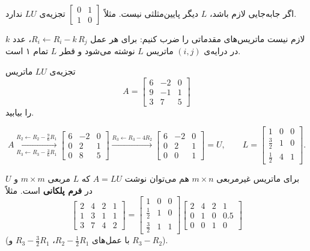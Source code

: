 \begin{warning}
اگر جابه‌جایی لازم باشد، $L$ دیگر پایین‌مثلثی نیست. مثلاً $\begin{bmatrix}0&1\\1&0\end{bmatrix}$ تجزیه‌ی $LU$ ندارد.
\end{warning}

\begin{note}
لازم نیست ماتریس‌های مقدماتی را ضرب کنیم: برای هر عمل $R_i\leftarrow R_i-k\,R_j$، عدد $k$ در درایه‌ی $(i,j)$ ماتریس $L$ نوشته می‌شود و قطر $L$ تمام ۱ است.
\end{note}

\begin{example}
تجزیه‌ی $LU$ ماتریس 
\[
A=\begin{bmatrix}6&-2&0\\9&-1&1\\3&7&5\end{bmatrix}
\]
را بیابید.
\end{example}
\begin{solution}
\[
A\xrightarrow[R_3\leftarrow R_3-\frac36R_1]{R_2\leftarrow R_2-\frac96R_1}
\begin{bmatrix}6&-2&0\\0&2&1\\0&8&5\end{bmatrix}
\xrightarrow{R_3\leftarrow R_3-4R_2}
\begin{bmatrix}6&-2&0\\0&2&1\\0&0&1\end{bmatrix}=U,
\qquad
L=\begin{bmatrix}1&0&0\\ \frac32&1&0\\ \frac12&4&1\end{bmatrix}.
\]
\end{solution}

برای ماتریس غیرمربعی $m\times n$ هم می‌توان نوشت $A=LU$ که $L$ مربعی $m\times m$ و $U$ در \textbf{فرم پلکانی} است. مثلاً
\[
\begin{bmatrix}2&4&2&1\\1&3&1&1\\3&7&4&2\end{bmatrix}
=\begin{bmatrix}1&0&0\\ \frac12&1&0\\ \frac32&1&1\end{bmatrix}
\begin{bmatrix}2&4&2&1\\0&1&0&0.5\\0&0&1&0\end{bmatrix}
\]
(با عمل‌های $R_2-\frac12R_1$، $R_3-\frac32R_1$ و $R_3-R_2$).

